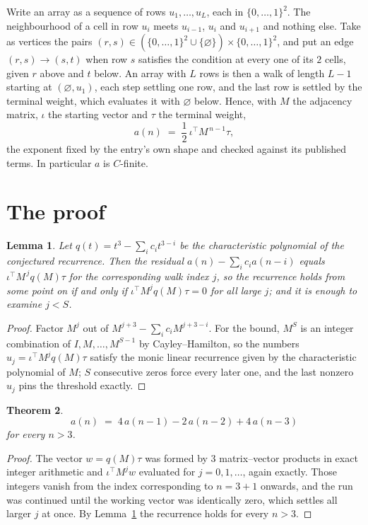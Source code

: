 \documentclass[11pt,a4paper]{article}
\theoremstyle{plain}
\newtheorem{theorem}{Theorem}
\newtheorem{lemma}[theorem]{Lemma}
\theoremstyle{definition}
\begin{document}
Write an array as a sequence of rows $u_1,\dots,u_L$, each in
$\{0,\dots,1\}^{2}$. The neighbourhood of a cell in row $u_i$ meets $u_{i-1}$,
$u_i$ and $u_{i+1}$ and nothing else. Take as vertices the pairs
$(r,s)\in(\{0,\dots,1\}^{2}\cup\{\varnothing\})\times\{0,\dots,1\}^{2}$,
and put an edge $(r,s)\to(s,t)$ when row $s$ satisfies the condition at every one of its
$2$ cells, given $r$ above and $t$ below. An array with $L$ rows is then a walk of length
$L-1$ starting at $(\varnothing,u_1)$, each step settling one row, and the last row is
settled by the terminal weight, which evaluates it with $\varnothing$ below. Hence,
with $M$ the adjacency matrix, $\iota$ the starting vector and $\tau$ the terminal weight,
\[
a(n)\;=\;\frac{1}{2}\,\iota^{\!\top}M^{\,n-1}\tau ,
\]
the exponent fixed by the entry's own shape and checked against its published terms. In
particular $a$ is $C$-finite.

\section{The proof}

\begin{lemma}\label{lem:crit}
Let $q(t)=t^{3}-\sum_i c_it^{3-i}$ be the characteristic polynomial of the
conjectured recurrence. Then the residual $a(n)-\sum_ic_ia(n-i)$ equals
$\iota^{\!\top}M^{\,j}q(M)\tau$ for the corresponding walk index $j$, so the
recurrence holds from some point on if and only if $\iota^{\!\top}M^{j}q(M)\tau=0$ for all
large $j$; and it is enough to examine $j<S$.
\end{lemma}

\begin{proof}
Factor $M^{j}$ out of $M^{j+3}-\sum_ic_iM^{j+3-i}$. For the bound, $M^{S}$
is an integer combination of $I,M,\dots,M^{S-1}$ by Cayley--Hamilton, so the numbers
$u_j=\iota^{\!\top}M^{j}q(M)\tau$ satisfy the monic linear recurrence given by the
characteristic polynomial of $M$; $S$ consecutive zeros force every later one, and the last
nonzero $u_j$ pins the threshold exactly.
\end{proof}

\begin{theorem}
\[
a(n)\;=\;4\,a(n-1) - 2\,a(n-2) + 4\,a(n-3)
\]
for every $n>3$.
\end{theorem}

\begin{proof}
The vector $w=q(M)\tau$ was formed by $3$ matrix--vector products in exact integer
arithmetic and $\iota^{\!\top}M^{j}w$ evaluated for $j=0,1,\dots$, again exactly. Those
integers vanish from the index corresponding to $n=3+1$ onwards, and the run was
continued until the working vector was identically zero, which settles all larger $j$ at once.
By Lemma~\ref{lem:crit} the recurrence holds for every $n>3$.
\end{proof}
\end{document}
